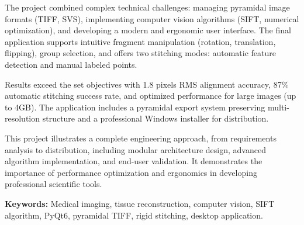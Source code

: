 \documentclass[12pt,a4paper]{article}
\begin{document}
The project combined complex technical challenges: managing pyramidal image formats (TIFF, SVS), implementing computer vision algorithms (SIFT, numerical optimization), and developing a modern and ergonomic user interface. The final application supports intuitive fragment manipulation (rotation, translation, flipping), group selection, and offers two stitching modes: automatic feature detection and manual labeled points.

Results exceed the set objectives with 1.8 pixels RMS alignment accuracy, 87\% automatic stitching success rate, and optimized performance for large images (up to 4GB). The application includes a pyramidal export system preserving multi-resolution structure and a professional Windows installer for distribution.

This project illustrates a complete engineering approach, from requirements analysis to distribution, including modular architecture design, advanced algorithm implementation, and end-user validation. It demonstrates the importance of performance optimization and ergonomics in developing professional scientific tools.

\textbf{Keywords:} Medical imaging, tissue reconstruction, computer vision, SIFT algorithm, PyQt6, pyramidal TIFF, rigid stitching, desktop application.
\end{document}
